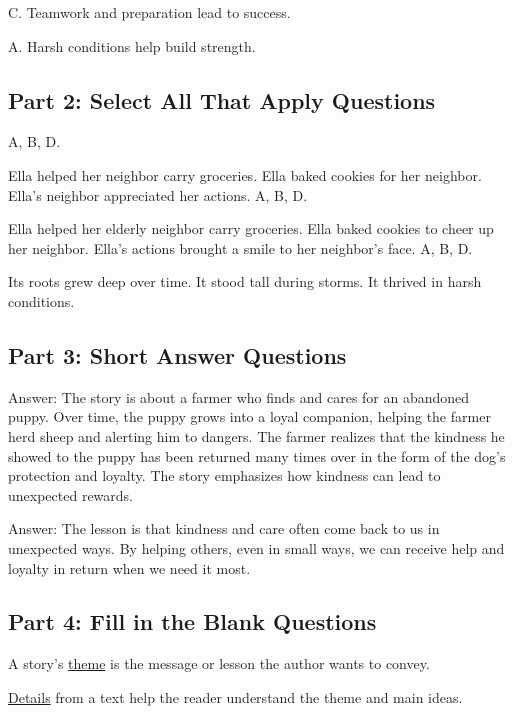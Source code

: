\documentclass[12pt]{article}
\begin{document}
C. Teamwork and preparation lead to success.

A. Harsh conditions help build strength.

\subsection*{Part 2: Select All That Apply Questions}

A, B, D.

Ella helped her neighbor carry groceries.
Ella baked cookies for her neighbor.
Ella’s neighbor appreciated her actions.
A, B, D.

Ella helped her elderly neighbor carry groceries.
Ella baked cookies to cheer up her neighbor.
Ella’s actions brought a smile to her neighbor’s face.
A, B, D.

Its roots grew deep over time.
It stood tall during storms.
It thrived in harsh conditions.
\subsection*{Part 3: Short Answer Questions}

Answer: The story is about a farmer who finds and cares for an abandoned puppy. Over time, the puppy grows into a loyal companion, helping the farmer herd sheep and alerting him to dangers. The farmer realizes that the kindness he showed to the puppy has been returned many times over in the form of the dog’s protection and loyalty. The story emphasizes how kindness can lead to unexpected rewards.

Answer: The lesson is that kindness and care often come back to us in unexpected ways. By helping others, even in small ways, we can receive help and loyalty in return when we need it most.

\subsection*{Part 4: Fill in the Blank Questions}

A story’s \underline{theme} is the message or lesson the author wants to convey.

\underline{Details} from a text help the reader understand the theme and main ideas.
\end{document}
